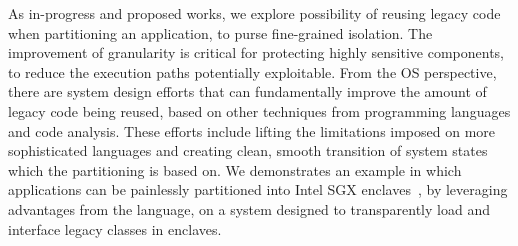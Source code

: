 
As in-progress and proposed works,
we explore possibility of reusing legacy code when partitioning an application,
to purse fine-grained isolation.
The improvement of granularity is critical for protecting highly sensitive components,
to reduce the execution paths
potentially exploitable.
From the OS perspective,
there are system design efforts that
can fundamentally improve the amount of legacy code being reused,
based on other techniques from programming languages and code analysis.
These efforts include
lifting the limitations imposed on more sophisticated languages
and creating clean, smooth transition of system states
which the partitioning is based on.
We demonstrates an example
in which applications can be painlessly partitioned
into Intel SGX enclaves~\citep{intelsgx},
by leveraging advantages from the \java{} language,
on a system designed to transparently load and interface legacy \java{} classes in enclaves.








